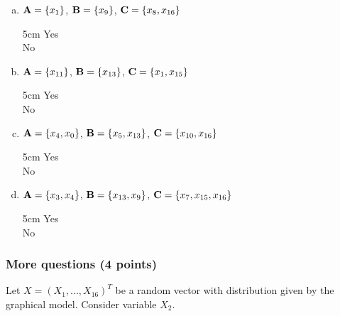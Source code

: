 \documentclass[11pt]{article}
\newcommand{\Unchecked}{{\LARGE \Square}}%
\newcommand{\answertextheight}{5cm}
\begin{document}
\begin{enumerate}[(a)]
\item {${\bf A} = \{x_1\}$, ${\bf B} = \{x_9\}$, ${\bf C} = \{x_8,x_{16}\}$}

\begin{answertext}{\answertextheight}{}
  \Unchecked Yes\\
  \Unchecked No

\end{answertext}

\item {${\bf A} = \{x_{11}\}$, ${\bf B} = \{x_{13}\}$, ${\bf C} = \{x_1,x_{15}\}$}

\begin{answertext}{\answertextheight}{}
  \Unchecked Yes\\
  \Unchecked No

\end{answertext}


\item ${\bf A} = \{x_4, x_0\}$, ${\bf B} = \{x_5, x_{13}\}$, ${\bf C} = \{x_{10},x_{16}\}$

\begin{answertext}{\answertextheight}{}
  \Unchecked Yes\\
  \Unchecked No

\end{answertext}


\item ${\bf A} = \{x_3, x_4\}$, ${\bf B} = \{x_{13},x_9\}$, ${\bf C} = \{x_7,x_{15},x_{16}\}$

\begin{answertext}{\answertextheight}{}
  \Unchecked Yes\\
  \Unchecked No

\end{answertext}

\end{enumerate}



\subsubsection{More questions (4 points)}
Let $X = (X_1, . . . , X_{16})^T$ be a random vector with distribution given by the graphical model.  Consider variable $X_2$.

\renewcommand{\answertextheight}{8cm}
\end{document}
